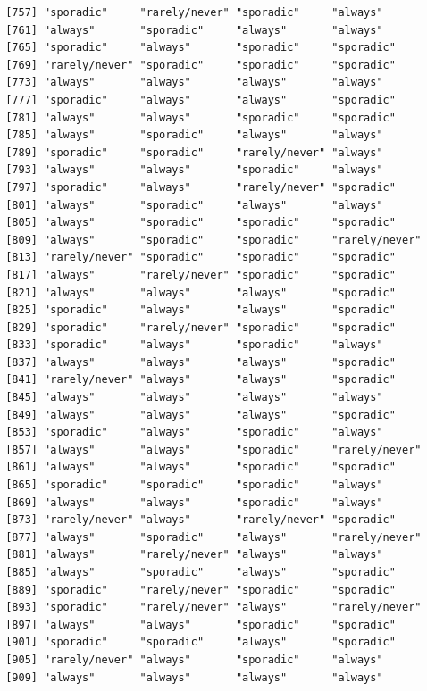 \documentclass[
  letterpaper,
  DIV=11,
  numbers=noendperiod]{scrartcl}
\begin{document}
\begin{verbatim}
 [757] "sporadic"     "rarely/never" "sporadic"     "always"      
 [761] "always"       "sporadic"     "always"       "always"      
 [765] "sporadic"     "always"       "sporadic"     "sporadic"    
 [769] "rarely/never" "sporadic"     "sporadic"     "sporadic"    
 [773] "always"       "always"       "always"       "always"      
 [777] "sporadic"     "always"       "always"       "sporadic"    
 [781] "always"       "always"       "sporadic"     "sporadic"    
 [785] "always"       "sporadic"     "always"       "always"      
 [789] "sporadic"     "sporadic"     "rarely/never" "always"      
 [793] "always"       "always"       "sporadic"     "always"      
 [797] "sporadic"     "always"       "rarely/never" "sporadic"    
 [801] "always"       "sporadic"     "always"       "always"      
 [805] "always"       "sporadic"     "sporadic"     "sporadic"    
 [809] "always"       "sporadic"     "sporadic"     "rarely/never"
 [813] "rarely/never" "sporadic"     "sporadic"     "sporadic"    
 [817] "always"       "rarely/never" "sporadic"     "sporadic"    
 [821] "always"       "always"       "always"       "sporadic"    
 [825] "sporadic"     "always"       "always"       "sporadic"    
 [829] "sporadic"     "rarely/never" "sporadic"     "sporadic"    
 [833] "sporadic"     "always"       "sporadic"     "always"      
 [837] "always"       "always"       "always"       "sporadic"    
 [841] "rarely/never" "always"       "always"       "sporadic"    
 [845] "always"       "always"       "always"       "always"      
 [849] "always"       "always"       "always"       "sporadic"    
 [853] "sporadic"     "always"       "sporadic"     "always"      
 [857] "always"       "always"       "sporadic"     "rarely/never"
 [861] "always"       "always"       "sporadic"     "sporadic"    
 [865] "sporadic"     "sporadic"     "sporadic"     "always"      
 [869] "always"       "always"       "sporadic"     "always"      
 [873] "rarely/never" "always"       "rarely/never" "sporadic"    
 [877] "always"       "sporadic"     "always"       "rarely/never"
 [881] "always"       "rarely/never" "always"       "always"      
 [885] "always"       "sporadic"     "always"       "sporadic"    
 [889] "sporadic"     "rarely/never" "sporadic"     "sporadic"    
 [893] "sporadic"     "rarely/never" "always"       "rarely/never"
 [897] "always"       "always"       "sporadic"     "sporadic"    
 [901] "sporadic"     "sporadic"     "always"       "sporadic"    
 [905] "rarely/never" "always"       "sporadic"     "always"      
 [909] "always"       "always"       "always"       "always"      

\end{verbatim}
\end{document}
